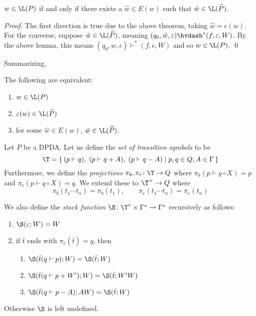 \documentclass{llncs}
\begin{document}
\begin{theorem}

    $w\in\L(P)$ if and only if there exists a $\hat w\in E(w)$ such that $\hat w\in\L(\widehat P)$.

\end{theorem}

\begin{proof}

    The first direction is true due to the above theorem, taking $\hat w=\epsilon(w)$.
    For the converse, suppose $\hat w\in\L(\widehat P)$, meaning $(q_0,\hat w,\epsilon)\hvdash^*(f,\epsilon,W)$.
    By the above lemma, this means $(q_0,w,\epsilon)\vdash^*(f,\epsilon,W)$ and so $w\in\L(P)$.
    \qed

\end{proof}

Summarizing,

\begin{corollary}

    The following are equivalent:
    \begin{enumerate}
        \item $w\in\L(P)$
        \item $\epsilon(w)\in\L(\widehat P)$
        \item for some $\hat w\in E(w)$, $\hat w\in\L(\widehat P)$.
    \end{enumerate}

\end{corollary}



Let $P$ be a DPDA.
Let us define the \emph{set of transition symbols} to be
$$ \T = \set{(p\vdash q),\;(p\vdash q+A),\;(p\vdash q-A)}[p,q\in Q,A\in\Gamma] $$
Furthermore, we define the \emph{projections} $\pi_b,\pi_e\colon\T\to Q$ where $\pi_b(p\vdash q\circ X)=p$ and $\pi_e(p\vdash q\circ X)=q$.
We extend these to $\T^+\to Q$ where
$$ \pi_b(t_1\cdots t_n) = \pi_b(t_1),\qquad \pi_e(t_1\cdots t_n) = \pi_e(t_n) $$

We also define the \emph{stack function} $\S\colon\T^*\times\Gamma^*\partial\Gamma^*$ recursively as follows:
\begin{enumerate}
    \item $\S(\epsilon;W)=W$
    \item if $\bar t$ ends with $\pi_e(\bar t)=q$, then
    \begin{enumerate}
        \item $\S(\bar t(q\vdash p);W)=\S(\bar t;W)$
        \item $\S(\bar t(q\vdash p+W');W)=\S(\bar t;W'W)$
        \item $\S(\bar t(q\vdash p-A);AW)=\S(\bar t;W)$
    \end{enumerate}
\end{enumerate}
Otherwise $\S$ is left undefined.
\end{document}
